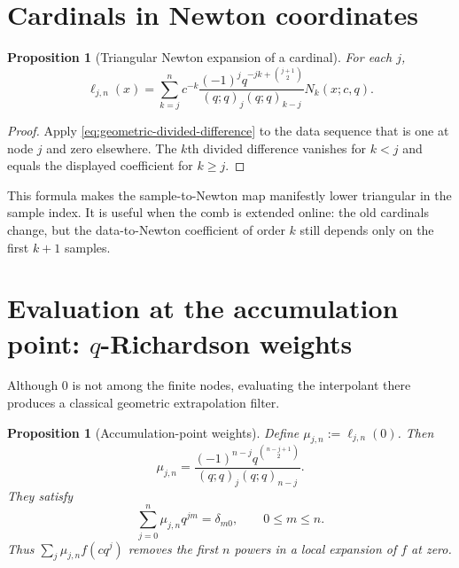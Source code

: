 \documentclass[11pt,oneside]{book}
\numberwithin{equation}{chapter}
\newtheorem{proposition}[theorem]{Proposition}
\theoremstyle{definition}
\theoremstyle{remark}
\begin{document}
\section{Cardinals in Newton coordinates}

\begin{proposition}[Triangular Newton expansion of a cardinal]
\label{prop:cardinal-newton}
For each $j$,
\begin{equation}
 \boxed{
 \ell_{j,n}(x)=\sum_{k=j}^n
 c^{-k}\frac{(-1)^jq^{-jk+\binom{j+1}{2}}}
 {(q;q)_j(q;q)_{k-j}}N_k(x;c,q).}
 \label{eq:cardinal-newton}
\end{equation}
\end{proposition}

\begin{proof}
Apply \eqref{eq:geometric-divided-difference} to the data sequence that is
one at node $j$ and zero elsewhere.  The $k$th divided difference vanishes
for $k<j$ and equals the displayed coefficient for $k\ge j$.
\end{proof}

This formula makes the sample-to-Newton map manifestly lower triangular in
the sample index.  It is useful when the comb is extended online: the old
cardinals change, but the data-to-Newton coefficient of order $k$ still
depends only on the first $k+1$ samples.

\section{Evaluation at the accumulation point: \texorpdfstring{$q$}{q}-Richardson weights}

Although $0$ is not among the finite nodes, evaluating the interpolant there
produces a classical geometric extrapolation filter.

\begin{proposition}[Accumulation-point weights]
\label{prop:richardson-weights}
Define $\mu_{j,n}:=\ell_{j,n}(0)$.  Then
\begin{equation}
 \boxed{
 \mu_{j,n}=\frac{(-1)^{n-j}
 q^{\binom{n-j+1}{2}}}
 {(q;q)_j(q;q)_{n-j}}.}
 \label{eq:richardson-weights}
\end{equation}
They satisfy
\begin{equation}
 \sum_{j=0}^n\mu_{j,n}q^{jm}=\delta_{m0},
 \qquad 0\le m\le n.
 \label{eq:richardson-moments}
\end{equation}
Thus $\sum_j\mu_{j,n}f(cq^j)$ removes the first $n$ powers in a local
expansion of $f$ at zero.
\end{proposition}
\end{document}
